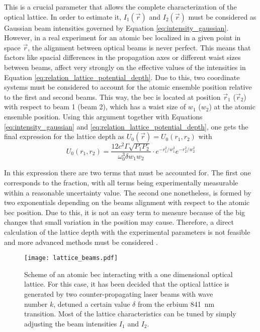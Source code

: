 This is a crucial parameter that allows the complete characterization of the optical lattice. In order to estimate it, $I_{1}(\vec{r})$ and $I_{2}(\vec{r})$ must be considered as Gaussian beam intensities governed by Equation \eqref{eq:intensity_gaussian}. However, in a real experiment for an atomic \ac{bec} localized in a given point in space $\vec{r}$, the alignment between optical beams is never perfect. This means that factors like spacial differences in the propagation axes or different waist sizes between beams, affect very strongly on the effective values of the intensities in Equation \eqref{eq:relation_lattice_potential_depth}. Due to this, two coordinate systems must be considered to account for the atomic ensemble position relative to the first and second beams. This way, the \ac{bec} is located at position $\vec{r}_1$ ($\vec{r}_2$) with respect to beam 1 (beam 2), which has a waist size of $w_1$ ($w_2$) at the atomic ensemble position. Using this argument together with Equations \eqref{eq:intensity_gaussian} and \eqref{eq:relation_lattice_potential_depth}, one gets the final expression for the lattice depth as $U_{0}(\vec{r})=U_{0}(r_1,r_2)$ with
\begin{equation}\label{eq:relation_lattice_potential_depth_final}
	U_{0}(r_1,r_2) = \frac{12 c^2 \Gamma\sqrt{P_1 P_2}}{\omega_0^3 \delta w_1 w_2} \cdot e^{-r_1^2/w_1^2} e^{-r_2^2/w_2^2}
\end{equation} 

In this expression there are two terms that must be accounted for. The first one corresponds to the fraction, with all terms being experimentally measurable within a reasonable uncertainty value. The second one nonetheless, is formed by two exponentials depending on the beams alignment with respect to the atomic \ac{bec} position. Due to this, it is not an easy term to measure because of the big changes that small variation in the position may cause. Therefore, a direct calculation of the lattice depth with the experimental parameters is not feasible and more advanced methods must be considered \cite{Kadau2011}.

\begin{figure}[!htbp]\centering
	\texttt{[image: lattice\_beams.pdf]}
	\caption[Scheme of an atomic \ac{bec} interacting with a one dimensional optical lattice]{Scheme of an atomic \ac{bec} interacting with a one dimensional optical lattice. For this case, it has been decided that the optical lattice is generated by two counter-propagating laser beams with wave number $k$, detuned a certain value $\delta$ from the erbium \SI{841}{\nano\meter} transition. Most of the lattice characteristics can be tuned by simply adjusting the beam intensities $I_1$ and $I_2$.}\label{fig:lattice_beams}
\end{figure}

